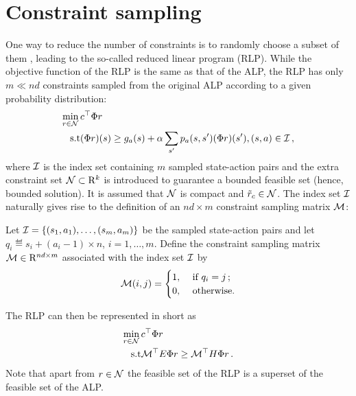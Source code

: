\section{Constraint sampling}
One way to reduce the number of constraints is to randomly choose a subset of them \cite{CS},
leading to the so-called reduced linear program (RLP). 
While the objective function of the RLP is the same as that of the ALP, 
the RLP has only $m \ll nd$ constraints sampled from the original ALP according to a given probability distribution:
\begin{align}\label{rlp}
\begin{split}
\min_{r\in \N}\, &c^\top \Phi r\\
\text{s.t}\mb &(\Phi r)(s)\geq g_a(s)+\alpha\sum_{s'}p_a(s,s')(\Phi r)(s'), \mb (s,a) \in \I\,,
\end{split}
\end{align}
where $\mathcal{I}$ is the index set containing $m$ sampled state-action pairs and
the extra constraint set $\mathcal{N}\subset \mathrm{R}^k$ is introduced to guarantee a bounded feasible set (hence, bounded solution).
It is assumed that $\mathcal{N}$ is compact and $\tilde{r}_c\in \mathcal{N}$. 
The index set $\mathcal{I}$ naturally gives rise to the definition of an $nd\times m$ constraint sampling matrix $\mathcal{M}$:
\begin{definition}\label{csampmat}
Let $\mathcal{I}=\{(s_1,a_1),\ldots,(s_m,a_m)\}$ be the sampled state-action pairs and let $q_i \eqdef s_i+(a_i-1)\times n$, $i=1,\ldots,m$. Define the constraint sampling matrix $\mathcal{M} \in \mathrm{R}^{nd\times m}$ associated with the index set $\mathcal{I}$ by
\begin{align}
\mathcal{M}(i,j)
=
\begin{cases}
1, & \text{ if } q_i = j\,;\\
0, & \text{ otherwise}.
\end{cases}
\end{align}
\end{definition}
The RLP can then be represented in short as
\begin{align}\label{rlpshort}
\begin{split}
\min_{r\in \N}\, &c^\top \Phi r\\
\text{s.t}\mb & \M^\top E \Phi r \geq \M^\top H \Phi r\,.
\end{split}
\end{align}
Note that apart from $r\in \mathcal{N}$ the feasible set of the RLP is a superset of the feasible set of the ALP.

